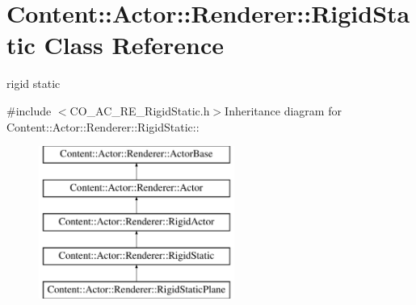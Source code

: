 \hypertarget{classContent_1_1Actor_1_1Renderer_1_1RigidStatic}{
\section{Content::Actor::Renderer::RigidStatic Class Reference}
\label{classContent_1_1Actor_1_1Renderer_1_1RigidStatic}
}


rigid static  


{\ttfamily \#include $<$CO\_\-AC\_\-RE\_\-RigidStatic.h$>$}Inheritance diagram for Content::Actor::Renderer::RigidStatic::\begin{figure}[H]
\begin{center}
\leavevmode
\includegraphics[height=5cm]{classContent_1_1Actor_1_1Renderer_1_1RigidStatic}
\end{center}
\end{figure}
